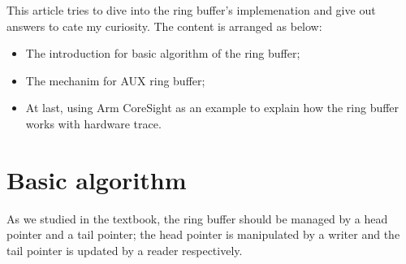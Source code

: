 \documentclass[11pt]{diazessay} %
\begin{document}
This article tries to dive into the ring buffer's implemenation and give out answers to cate my curiosity.  The content is arranged as below:
\begin{itemize}
	\item The introduction for basic algorithm of the ring buffer;
	\item The mechanim for AUX ring buffer;
	\item At last, using Arm CoreSight as an example to explain how the ring buffer works with hardware trace.
\end{itemize}

\section*{Basic algorithm}

As we studied in the textbook, the ring buffer should be managed by a head pointer and a tail pointer; the head pointer is manipulated by a writer and the tail pointer is updated by a reader respectively.
\end{document}
